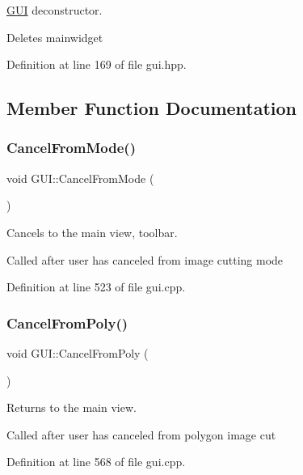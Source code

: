 \mbox{\hyperlink{classGUI}{G\+UI}} deconstructor. 

Deletes mainwidget 

Definition at line 169 of file gui.\+hpp.



\subsection{Member Function Documentation}
\mbox{\label{classGUI_a8188dd01b2dc9354afbbf2f4b18fd19a}} 
\subsubsection{\texorpdfstring{Cancel\+From\+Mode()}{CancelFromMode()}}
{\footnotesize\ttfamily void G\+U\+I\+::\+Cancel\+From\+Mode (\begin{DoxyParamCaption}{ }\end{DoxyParamCaption})}



Cancels to the main view, toolbar. 

Called after user has canceled from image cutting mode 

Definition at line 523 of file gui.\+cpp.

\mbox{\label{classGUI_a9f2b3abf533a7c720b817caed653da2e}} 
\subsubsection{\texorpdfstring{Cancel\+From\+Poly()}{CancelFromPoly()}}
{\footnotesize\ttfamily void G\+U\+I\+::\+Cancel\+From\+Poly (\begin{DoxyParamCaption}{ }\end{DoxyParamCaption})}



Returns to the main view. 

Called after user has canceled from polygon image cut 

Definition at line 568 of file gui.\+cpp.

\mbox{\label{classGUI_a3e6d9c2c9482bf8cb9655899b36e8bc1}} 
